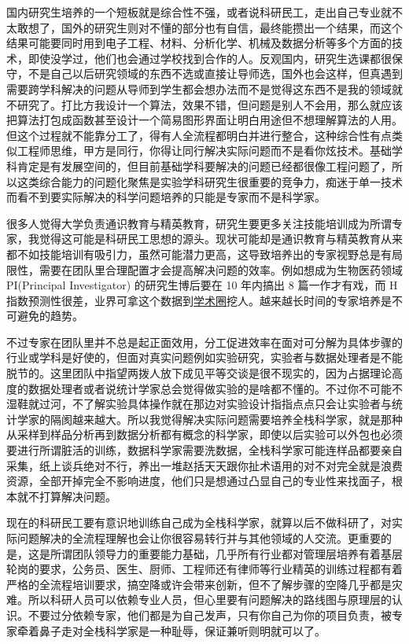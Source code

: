 \documentclass[]{tufte-book}
\begin{document}
国内研究生培养的一个短板就是综合性不强，或者说科研民工，走出自己专业就不太敢想了，国外的研究生则对不懂的部分也有自信，最终能攒出一个结果，而这个结果可能要同时用到电子工程、材料、分析化学、机械及数据分析等多个方面的技术，即使没学过，他们也会通过学校找到合作的人。反观国内，研究生选课都很保守，不是自己以后研究领域的东西不选或直接让导师选，国外也会这样，但真遇到需要跨学科解决的问题从导师到学生都会想办法而不是觉得这东西不是我的领域就不研究了。打比方我设计一个算法，效果不错，但问题是别人不会用，那么就应该把算法打包成函数甚至设计一个简易图形界面让明白用途但不想理解算法的人用。但这个过程就不能靠分工了，得有人全流程都明白并进行整合，这种综合性有点类似工程师思维，甲方是同行，你得让同行解决实际问题而不是看你炫技术。基础学科肯定是有发展空间的，但目前基础学科要解决的问题已经都很像工程问题了，所以这类综合能力的问题化聚焦是实验学科研究生很重要的竞争力，痴迷于单一技术而看不到要实际解决的科学问题培养的只能是专家而不是科学家。

很多人觉得大学负责通识教育与精英教育，研究生要更多关注技能培训成为所谓专家，我觉得这可能是科研民工思想的源头。现状可能却是通识教育与精英教育从来都不如技能培训有吸引力，虽然可能潜力更高，这导致培养出的专家视野总是有局限性，需要在团队里合理配置才会提高解决问题的效率。例如想成为生物医药领域 PI(Principal Investigator) 的研究生博后要在 10 年内搞出 8 篇一作才有戏，而 H 指数预测性很差，业界可拿这个数据到\href{https://peerj.com/articles/1262/}{学术圈}挖人。越来越长时间的专家培养是不可避免的趋势。

不过专家在团队里并不总是起正面效用，分工促进效率在面对可分解为具体步骤的行业或学科是好使的，但面对真实问题例如实验研究，实验者与数据处理者是不能脱节的。这里团队中指望两拨人放下成见平等交谈是很不现实的，因为占据理论高度的数据处理者或者说统计学家总会觉得做实验的是啥都不懂的。不过你不可能不湿鞋就过河，不了解实验具体操作就在那边对实验设计指指点点只会让实验者与统计学家的隔阂越来越大。所以我觉得解决实际问题需要培养全栈科学家，就是那种从采样到样品分析再到数据分析都有概念的科学家，即使以后实验可以外包也必须要进行所谓脏活的训练，数据科学家需要洗数据，全栈科学家可能连样品都要亲自采集，纸上谈兵绝对不行，养出一堆赵括天天跟你扯术语用的对不对完全就是浪费资源，全部开掉完全不影响进度，他们只是想通过凸显自己的专业性来找面子，根本就不打算解决问题。

现在的科研民工要有意识地训练自己成为全栈科学家，就算以后不做科研了，对实际问题解决的全流程理解也会让你很容易转行并与其他领域的人交流。更重要的是，这是所谓团队领导力的重要能力基础，几乎所有行业都对管理层培养有着基层轮岗的要求，公务员、医生、厨师、工程师还有律师等行业精英的训练过程都有着严格的全流程培训要求，搞空降或许会带来创新，但不了解步骤的空降几乎都是灾难。所以科研人员可以依赖专业人员，但心里要有问题解决的路线图与原理层的认识。不要过分依赖专家，他们都是为自己发声，只有你自己为你的项目负责，被专家牵着鼻子走对全栈科学家是一种耻辱，保证兼听则明就可以了。
\end{document}
